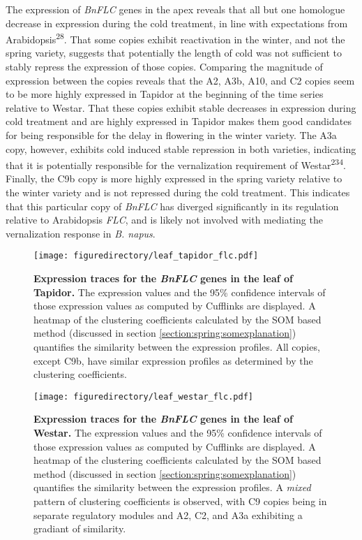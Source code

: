 \documentclass[12pt,]{book}
\begin{document}
The expression of \emph{BnFLC} genes in the apex reveals that all but
one homologue decrease in expression during the cold treatment, in line
with expectations from Arabidopsis\textsuperscript{28}. That some copies
exhibit reactivation in the winter, and not the spring variety, suggests
that potentially the length of cold was not sufficient to stably repress
the expression of those copies. Comparing the magnitude of expression
between the copies reveals that the A2, A3b, A10, and C2 copies seem to
be more highly expressed in Tapidor at the beginning of the time series
relative to Westar. That these copies exhibit stable decreases in
expression during cold treatment and are highly expressed in Tapidor
makes them good candidates for being responsible for the delay in
flowering in the winter variety. The A3a copy, however, exhibits cold
induced stable repression in both varieties, indicating that it is
potentially responsible for the vernalization requirement of
Westar\textsuperscript{234}. Finally, the C9b copy is more highly
expressed in the spring variety relative to the winter variety and is
not repressed during the cold treatment. This indicates that this
particular copy of \emph{BnFLC} has diverged significantly in its
regulation relative to Arabidopsis \emph{FLC}, and is likely not
involved with mediating the vernalization response in \emph{B. napus}.

\begin{figure}[htbp]
\centering
\texttt{[image: figuredirectory/leaf\_tapidor\_flc.pdf]}
\caption{\textbf{Expression traces for the \emph{BnFLC} genes in the
leaf of Tapidor.} The expression values and the 95\% confidence
intervals of those expression values as computed by Cufflinks are
displayed. A heatmap of the clustering coefficients calculated by the
SOM based method (discussed in section
\ref{section:spring:somexplanation}) quantifies the similarity between
the expression profiles. All copies, except C9b, have similar expression
profiles as determined by the clustering
coefficients.}\label{figure:3xx:flctapleaf}
\end{figure}

\begin{figure}[htbp]
\centering
\texttt{[image: figuredirectory/leaf\_westar\_flc.pdf]}
\caption{\textbf{Expression traces for the \emph{BnFLC} genes in the
leaf of Westar.} The expression values and the 95\% confidence intervals
of those expression values as computed by Cufflinks are displayed. A
heatmap of the clustering coefficients calculated by the SOM based
method (discussed in section \ref{section:spring:somexplanation})
quantifies the similarity between the expression profiles. A
\emph{mixed} pattern of clustering coefficients is observed, with C9
copies being in separate regulatory modules and A2, C2, and A3a
exhibiting a gradiant of similarity.}\label{figure:3xx:flcwesleaf}
\end{figure}
\end{document}
